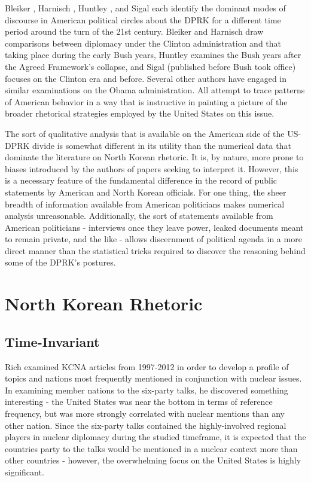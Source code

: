Bleiker \cite{bleiker}, Harnisch \cite{harnisch}, Huntley \cite{huntley}, and Sigal \cite{sigal} each identify the dominant modes of discourse in American political circles about the DPRK for a different time period around the turn of the 21st century. Bleiker and Harnisch draw comparisons between diplomacy under the Clinton administration and that taking place during the early Bush years, Huntley examines the Bush years after the Agreed Framework's collapse, and Sigal (published before Bush took office) focuses on the Clinton era and before. Several other authors \cite{crs13,green} have engaged in similar examinations on the Obama administration. All attempt to trace patterns of American behavior in a way that is instructive in painting a picture of the broader rhetorical strategies employed by the United States on this issue.

The sort of qualitative analysis that is available on the American side of the US-DPRK divide is somewhat different in its utility than the numerical data that dominate the literature on North Korean rhetoric. It is, by nature, more prone to biases introduced by the authors of papers seeking to interpret it. However, this is a necessary feature of the fundamental difference in the record of public statements by American and North Korean officials. For one thing, the sheer breadth of information available from American politicians makes numerical analysis unreasonable. Additionally, the sort of statements available from American politicians - interviews once they leave power, leaked documents meant to remain private, and the like - allows discernment of political agenda in a more direct manner than the statistical tricks required to discover the reasoning behind some of the DPRK's postures. %

\section{North Korean Rhetoric}
\subsection{Time-Invariant}
Rich \cite{rich14} examined KCNA articles from 1997-2012 in order to develop a profile of topics and nations most frequently mentioned in conjunction with nuclear issues. In examining member nations to the six-party talks, he discovered something interesting -  the United States was near the bottom in terms of reference frequency, but was more strongly correlated with nuclear mentions than any other nation. Since the six-party talks contained the highly-involved regional players in nuclear diplomacy during the studied timeframe, it is expected that the countries party to the talks would be mentioned in a nuclear context more than other countries - however, the overwhelming focus on the United States is highly significant.

